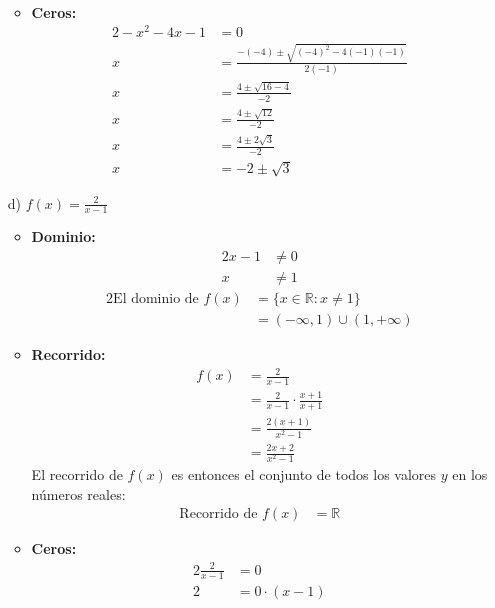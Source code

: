 \documentclass{templateNote}
\begin{document}
\begin{itemize}
\begin{itemize}
\begin{align*}
        \end{align*}
        \item \textbf{Ceros:}
        \begin{alignat*}{2}
            -x^2 - 4x - 1 &= 0 \\
            x &= \frac{-(-4) \pm \sqrt{(-4)^2 - 4(-1)(-1)}}{2(-1)} \\
            x &= \frac{4 \pm \sqrt{16 - 4}}{-2} \\
            x &= \frac{4 \pm \sqrt{12}}{-2} \\
            x &= \frac{4 \pm 2\sqrt{3}}{-2} \\
            x &= -2 \pm \sqrt{3}
        \end{alignat*}
    \end{itemize}
    \item[d)] $f(x) = \frac{2}{x - 1}$
    \begin{itemize}
        \item \textbf{Dominio:}
        \begin{alignat*}{2}
            x - 1 &\neq 0 \\
            x &\neq 1
        \end{alignat*}
        \begin{alignat*}{2}
            \text{El dominio de } f(x) &= \{x \in \mathbb{R} : x \neq 1\} \\
            &= (-\infty, 1) \cup (1, +\infty)
        \end{alignat*}
        \item \textbf{Recorrido:}
        \begin{align*}
            f(x) &= \frac{2}{x - 1} \\
            &= \frac{2}{x - 1} \cdot \frac{x + 1}{x + 1} \\
            &= \frac{2(x + 1)}{x^2 - 1} \\
            &= \frac{2x + 2}{x^2 - 1}
        \end{align*}
        El recorrido de \( f(x) \) es entonces el conjunto de todos los valores \( y \) en los números reales:
        \begin{align*}
            \text{Recorrido de } f(x) &= \mathbb{R}
        \end{align*}
        \item \textbf{Ceros:}
        \begin{alignat*}{2}
            \frac{2}{x - 1} &= 0 \\
            2 &= 0 \cdot (x - 1) \\

\end{alignat*}
\end{itemize}
\end{itemize}
\end{document}
